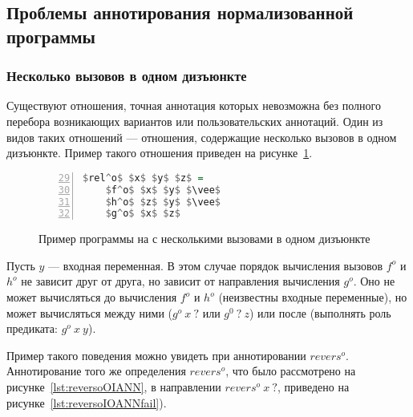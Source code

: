 \subsection{Проблемы аннотирования нормализованной программы}
\label{lab:problems}


\subsubsection{Несколько вызовов в одном дизъюнкте}
\label{lab:disjPerm}

Существуют отношения, точная аннотация которых невозможна без полного перебора возникающих вариантов или пользовательских аннотаций.
Один из видов таких отношений --- отношения, содержащие несколько вызовов в одном дизъюнкте.
Пример такого отношения приведен на рисунке~\ref{lst:reloDEF}.

\begin{figure}[h!]
  \begin{center}
  \begin{minipage}{0.18\textwidth}
  \begin{lstlisting}[language=Haskell, frame=single, numbers=left,numberstyle=\small, firstnumber=29, escapechar=|]
  $rel^o$ $x$ $y$ $z$ =
    $f^o$ $x$ $y$ $\vee$
    $h^o$ $z$ $y$ $\vee$
    $g^o$ $x$ $z$
    \end{lstlisting}
  \end{minipage}
  \end{center}
  \caption{Пример программы на \miniKanren{} с несколькими вызовами в одном дизъюнкте}
  \label{lst:reloDEF}
\end{figure}

Пусть $y$ --- входная переменная.
В этом случае порядок вычисления вызовов $f^o$ и $h^o$ не зависит друг от друга, но зависит от направления вычисления $g^o$.
Оно не может вычисляться до вычисления $f^o$ и $h^o$ (неизвестны входные переменные), но может вычисляться между ними ($g^o \ x \ ?$ или $g^0 \ ? \ z$) или после (выполнять роль предиката: $g^o \ x \ y$).

Пример такого поведения можно увидеть при аннотировании $revers^o$.
Аннотирование того же определения $revers^o$, что было рассмотрено на рисунке~\ref{lst:reversoOIANN}, в направлении $revers^o \ x \ ?$, приведено на рисунке~\ref{lst:reversoIOANNfail}).

